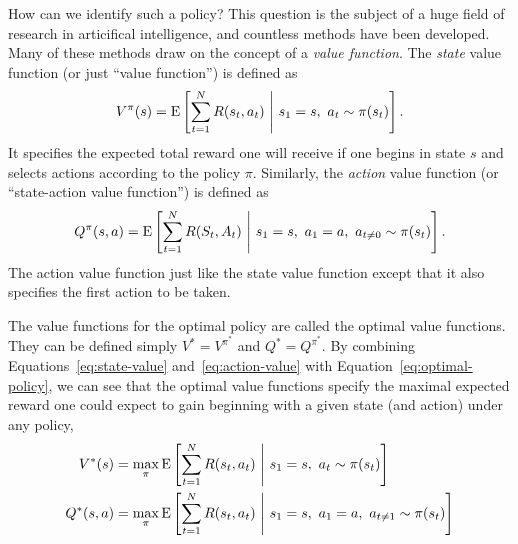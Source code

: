 How can we identify such a policy? This question is the subject of a huge field of research in articifical intelligence, and countless methods have been developed. Many of these methods draw on the concept of a \emph{value function}. The \emph{state} value function (or just ``value function'') is defined as
%
\begin{equation}\label{eq:state-value}
  V^\pi(s) = \operatorname*{E} \left[ 
    \sum_{t=1}^{N} R(s_t, a_t)
   \ \middle\vert\ 
   s_1 = s,\ a_t \sim \pi(s_t)
   \right].
\end{equation}
%
It specifies the expected total reward one will receive if one begins in state $s$ and selects actions according to the policy $\pi$. Similarly, the \emph{action} value function (or ``state-action value function'') is defined as
%
\begin{equation}\label{eq:action-value}
  Q^\pi(s, a) = \operatorname*{E} \left[ 
    \sum_{t=1}^{N} R(S_t, A_t)
   \ \middle\vert\ 
   s_1 = s,\ a_1 = a,\ a_{t \neq 0} \sim \pi(s_t)
   \right].
\end{equation}
%
The action value function just like the state value function except that it also specifies the first action to be taken. 

The value functions for the optimal policy are called the optimal value functions. They can be defined simply $V^* = V^{\pi^*}$ and $Q^* = Q^{\pi^*}$. By combining Equations~\ref{eq:state-value} and~\ref{eq:action-value} with Equation~\ref{eq:optimal-policy}, we can see that the optimal value functions specify the maximal expected reward one could expect to gain beginning with a given state (and action) under any policy,
\begin{equation}
  \begin{aligned}
  V^*(s) &= \max_\pi \operatorname*{E} \left[ 
    \sum_{t=1}^{N} R(s_t, a_t)
   \ \middle\vert\ 
   s_1 = s,\ a_t \sim \pi(s_t)
   \right] \\
  Q^*(s, a) &= \max_\pi \operatorname*{E} \left[ 
    \sum_{t=1}^{N} R(s_t, a_t)
   \ \middle\vert\ 
   s_1 = s,\ a_1 = a,\ a_{t \neq 1} \sim \pi(s_t)
   \right]
  \end{aligned}
\end{equation}

